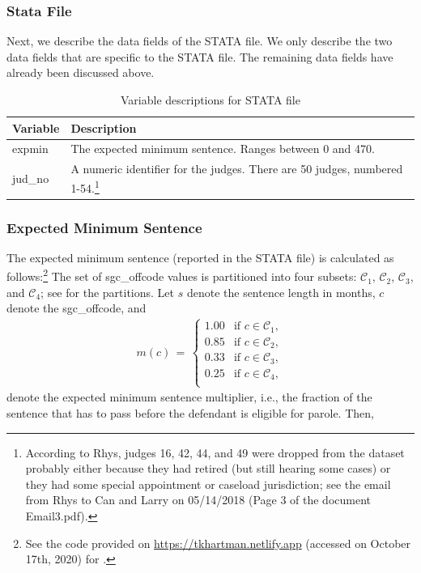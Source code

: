 \documentclass[11pt, oneside]{article}   	%
\theoremstyle{ModifiedStyle}
\begin{document}
    \subsubsection{Stata File}
    	\label{Sec:Data_Description:STATA}
    	Next, we describe the data fields of the STATA file. We only describe the two data fields that are specific to the STATA file. The remaining data fields have already been discussed above.

      \begin{table}[H]
        \centering
        \caption{Variable descriptions for STATA file}
        \label{tab:stata-vars}
        \begin{tabular}{|ll|}
        \hline
        \textbf{Variable} & \textbf{Description}                                                        \\ \hline
        expmin              & The expected minimum sentence. Ranges between 0 and 470.                \\
        jud\_no          & A numeric identifier for the judges. There are 50 judges, numbered 1-54.\footnote{According to Rhys, judges 16, 42, 44, and 49 were dropped from the dataset probably either because they had retired (but still hearing some cases) or they had some special appointment or caseload jurisdiction; see the email from Rhys to Can and Larry on 05/14/2018 (Page 3 of the document Email3.pdf).}\\ \hline
        \end{tabular}
      \end{table}

    \subsubsection{Expected Minimum Sentence}
      The expected minimum sentence (reported in the STATA file) is calculated as follows:\footnote{See the code provided on \url{https://tkhartman.netlify.app} (accessed on October 17th, 2020) for \cite{hester2017conditional}.} The set of sgc\_offcode values is partitioned into four subsets: $\mathcal{C}_1$, $\mathcal{C}_2$, $\mathcal{C}_3$, and $\mathcal{C}_4$; see \cite{hester2017conditional} for the partitions. Let $s$ denote the sentence length in months, $c$ denote the sgc\_offcode, and
        \begin{align*}
          m(c) \,=\, \left \{\!\! \begin{array}{ll}
          1.00 & \text{if } c \in \mathcal{C}_1, \\
          0.85 & \text{if } c \in \mathcal{C}_2, \\
          0.33 & \text{if } c \in \mathcal{C}_3, \\
          0.25 & \text{if } c \in \mathcal{C}_4, \\
          \end{array} \right.
        \end{align*}
        denote the expected minimum sentence multiplier, i.e., the fraction of the sentence that has to pass before the defendant is eligible for parole. Then,
\end{document}
